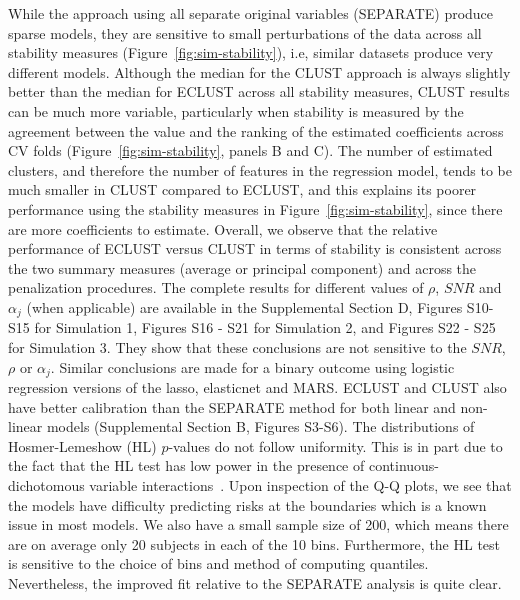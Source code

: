 

While the approach using all separate original variables (SEPARATE) produce sparse models, they are sensitive to small perturbations of the data across all stability measures (Figure~\ref{fig:sim-stability}), i.e, similar datasets produce very different models. 
Although the median for the CLUST approach is always slightly better than the median for ECLUST across all stability measures, CLUST results can be much more variable, particularly when stability is measured by the agreement between the value and the ranking of the estimated coefficients across CV folds (Figure~\ref{fig:sim-stability}, panels B and C). The number of estimated clusters, and therefore the number of features in the regression model, tends to be much smaller in CLUST compared to ECLUST, and this explains its poorer performance using the stability measures in Figure~\ref{fig:sim-stability}, since there are more coefficients to estimate. Overall, we observe that the relative performance of ECLUST versus CLUST in terms of stability is consistent across the two summary measures (average or principal component) and across the penalization procedures. The complete results for different values of $\rho$, $SNR$ and $\alpha_{j}$ (when applicable) are available in the Supplemental Section D, Figures S10-S15 for Simulation 1, Figures S16 - S21 for Simulation 2, and Figures S22 - S25 for Simulation 3. They show that these conclusions are not sensitive to the $SNR$, $\rho$ or $\alpha_j$. Similar conclusions are made for a binary outcome using logistic regression versions of the lasso, elasticnet and MARS. ECLUST and CLUST also have better calibration than the SEPARATE method for both linear and non-linear models (Supplemental Section B, Figures S3-S6). The distributions of Hosmer-Lemeshow (HL) $p$-values do not follow uniformity. This is in part due to the fact that the HL test has low power in the presence of continuous-dichotomous variable interactions~\citep{hosmer1997comparison}. Upon inspection of the Q-Q plots, we see that the models have difficulty predicting risks at the boundaries which is a known issue in most models. We also have a small sample size of 200, which means there are on average only 20 subjects in each of the 10 bins. Furthermore, the HL test is sensitive to the choice of bins and method of computing quantiles. Nevertheless, the improved fit relative to the SEPARATE analysis is quite clear.

